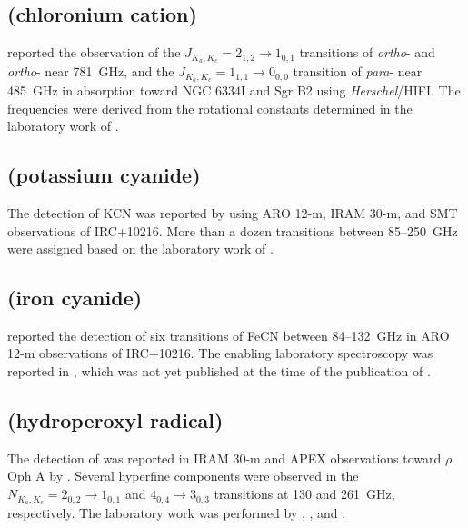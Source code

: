 \documentclass[twocolumn]{aastex631}
\begin{document}
	\subsection{ (chloronium cation)}
	\label{H2Cl+}
	
	\citet{Lis:2010ff} reported the observation of the $J_{K_a,K_c} = 2_{1,2}\rightarrow1_{0,1}$ transitions of \emph{ortho}- and \emph{ortho}- near 781~GHz, and the $J_{K_a,K_c} = 1_{1,1}\rightarrow0_{0,0}$ transition of \emph{para}- near 485~GHz in absorption toward NGC 6334I and Sgr B2 using \emph{Herschel}/HIFI.  The frequencies were derived from the rotational constants determined in the laboratory work of \citet{Araki:2001dh}.
	
	\subsection{ (potassium cyanide)}
	\label{KCN}
	
	The detection of KCN was reported by \citet{Pulliam:2010he} using ARO 12-m, IRAM 30-m, and SMT observations of IRC+10216.  More than a dozen transitions between 85--250~GHz were assigned based on the laboratory work of \citet{Torring:1980ef}.
	
	\subsection{ (iron cyanide)}
	\label{FeCN}
	
	\citet{Zack:2011jx} reported the detection of six transitions of FeCN between 84--132~GHz in ARO 12-m observations of IRC+10216.  The enabling laboratory spectroscopy was reported in \citet{Flory:2011ew}, which was not yet published at the time of the publication of \citet{Zack:2011jx}.
	
	\subsection{ (hydroperoxyl radical)}
	\label{HO2}
	
	The detection of  was reported in IRAM 30-m and APEX observations toward $\rho$ Oph A by \citet{Parise:2012hh}.  Several hyperfine components were observed in the $N_{K_a,K_c} = 2_{0,2}\rightarrow1_{0,1}$ and $4_{0,4}\rightarrow3_{0,3}$ transitions at 130 and 261~GHz, respectively.  The laboratory work was performed by \citet{Beers:1975ei}, \citet{Saito:1977cg}, and \citet{Charo:1982he}.
	
\end{document}
